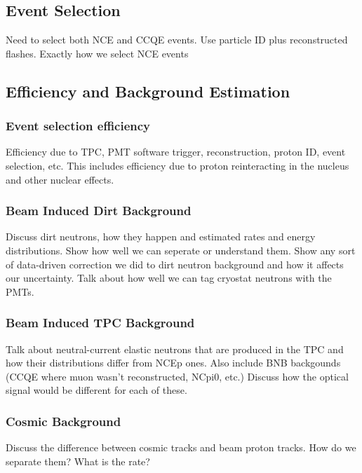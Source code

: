 \subsection{Event Selection}\label{sec:selection}
  Need to select both NCE and CCQE events.
  Use particle ID plus reconstructed flashes.
  Exactly how we select NCE events 


\subsection{Efficiency and Background Estimation}\label{sec:effbg}
  \subsubsection{Event selection efficiency}
    Efficiency due to TPC, PMT software trigger, reconstruction, proton ID,
    event selection, etc. This includes efficiency due to proton reinteracting
    in the nucleus and other nuclear effects.
  \subsubsection{Beam Induced Dirt Background}
    Discuss dirt neutrons, how they happen and estimated rates and energy
    distributions.  Show how well we can seperate or understand them. Show any
    sort of data-driven correction we did to dirt neutron background and how it
    affects our uncertainty. Talk about how well we can tag cryostat neutrons
    with the PMTs.
  \subsubsection{Beam Induced TPC Background}
    Talk about neutral-current elastic neutrons that are produced in the TPC
    and how their distributions differ from NCEp ones. Also include BNB
    backgounds (CCQE where muon wasn't reconstructed, NCpi0, etc.) Discuss how
    the optical signal would be different for each of these.
  \subsubsection{Cosmic Background}
    Discuss the difference between cosmic tracks and beam proton tracks. How do
    we separate them? What is the rate?


